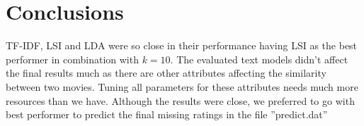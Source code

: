 \documentclass{sigish}
\begin{document}
\section{Conclusions}

TF-IDF, LSI and LDA were so close in their performance having LSI as the best performer in combination with $ k = 10 $. The evaluated text models didn't affect the final results much as there are other attributes affecting the similarity between two movies. Tuning all parameters for these attributes needs much more resources than we have. Although the results were close, we preferred to go with best performer to predict the final missing ratings in the file ''predict.dat''



\end{document}
